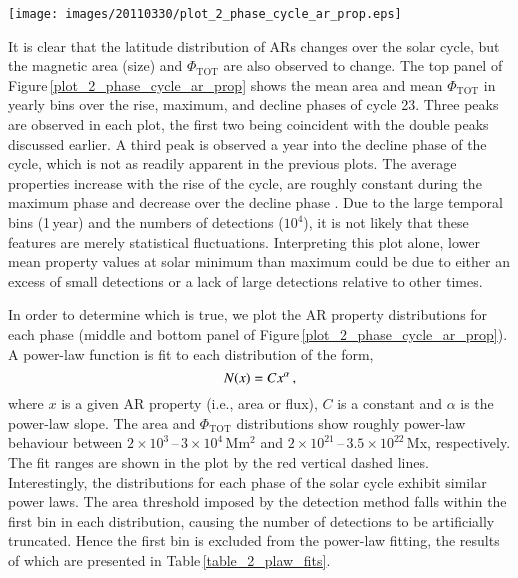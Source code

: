 \documentclass[namedreferences]{solarphysics}
\begin{document}
\begin{article}
\begin{figure*}[!ht]
\texttt{[image: images/20110330/plot\_2\_phase\_cycle\_ar\_prop.eps]}
\caption{\emph{Top}: Average magnetic feature area and $\Phi_{\mathrm{TOT}}$ in yearly, 6-month, and 3-month bins (black, dashed gray, and gray lines, respectively). Vertical red lines denote beginning and end of solar cycle phases. Arrows indicate peaks in $\langle$area$\rangle$ and $\langle\Phi\rangle$. \emph{Middle}: Distributions of detection areas for ``rise" (dashed line), ``maximum" (black line), and ``decline" (gray line) phases defined in \emph{top} panel. A power-law fit to the rise-phase distribution is indicated by the solid red line and the bounds of the fit are indicated by the vertical red dashed lines. \emph{Bottom}: Same as \emph{middle} panel, but showing $\Phi_{\mathrm{TOT}}$.}
\label{plot_2_phase_cycle_ar_prop}
\end{figure*}


It is clear that the latitude distribution of ARs changes over the solar cycle, but the magnetic area (size) and $\Phi_{\mathrm{TOT}}$ are also observed to change. The top panel of Figure\,\ref{plot_2_phase_cycle_ar_prop} shows the mean area and mean $\Phi_{\mathrm{TOT}}$ in yearly bins over the rise, maximum, and decline phases of cycle 23. Three peaks are observed in each plot, the first two being coincident with the double peaks discussed earlier. A third peak is observed a year into the decline phase of the cycle, which is not as readily apparent in the previous plots. The average properties increase with the rise of the cycle, are roughly constant during the maximum phase and decrease over the decline phase \citep[agreeing with the findings of][]{tang:1984}. Due to the large temporal bins (1\,year) and the numbers of detections ($10^4$), it is not likely that these features are merely statistical fluctuations. Interpreting this plot alone, lower mean property values at solar minimum than maximum could be due to either an excess of small detections or a lack of large detections relative to other times.

In order to determine which is true, we plot the AR property distributions for each phase (middle and bottom panel of Figure\,\ref{plot_2_phase_cycle_ar_prop}). A power-law function is fit to each distribution %
 of the form,
\begin{equation}\label{eqn:powerlaw}
N(x) = C x^\alpha \mbox{\,,}
\end{equation}
where $x$ is a given AR property (i.e., area or flux), $C$ is a constant and $\alpha$ is the power-law slope. The area and $\Phi_{\mathrm{TOT}}$ distributions show roughly power-law behaviour between $2\times10^{3}$\,--\,$3\times10^4$\,Mm$^{2}$ and $2\times10^{21}$\,--\,$3.5\times10^{22}$\,Mx, respectively. The fit ranges are shown in the plot by the red vertical dashed lines. Interestingly, the distributions for each phase of the solar cycle exhibit similar power laws. The area threshold imposed by the detection method falls within the first bin in each distribution, causing the number of detections to be artificially truncated. Hence the first bin is excluded from the power-law fitting, the results of which are presented in Table\,\ref{table_2_plaw_fits}.


\end{article}
\end{document}
